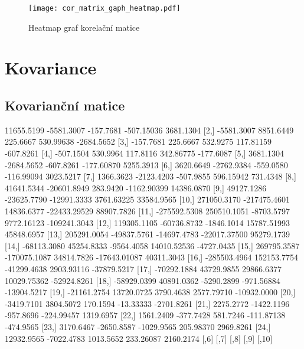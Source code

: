 \documentclass[a4paper, 12pt]{article}
\begin{document}
\begin{figure}[H]
\centering

\texttt{[image: cor\_matrix\_gaph\_heatmap.pdf]}
\caption{Heatmap graf korelační matice}
\end{figure}

\section{Kovariance}
\subsection{Kovarianční matice}
\begin{Schunk}
\begin{Soutput}
              [,1]         [,2]        [,3]         [,4]         [,5]
 [1,]   11655.5199   -5581.3007   -157.7681   -507.15036    3681.1304
 [2,]   -5581.3007    8851.6449    225.6667    530.99638   -2684.5652
 [3,]    -157.7681     225.6667    532.9275    117.81159    -607.8261
 [4,]    -507.1504     530.9964    117.8116    342.86775    -177.6087
 [5,]    3681.1304   -2684.5652   -607.8261   -177.60870    5255.3913
 [6,]    3620.6649   -2762.9384   -559.0580   -116.99094    3023.5217
 [7,]    1366.3623   -2123.4203   -507.9855    596.15942     731.4348
 [8,]   41641.5344  -20601.8949    283.9420  -1162.90399   14386.0870
 [9,]   49127.1286  -23625.7790 -12991.3333   3761.63225   33584.9565
[10,]  271050.3170 -217475.4601  14836.6377 -22433.29529   88907.7826
[11,] -275592.5308  250510.1051  -8703.5797   9772.16123 -109241.3043
[12,]  119305.1105  -60736.8732  -1846.1014  15787.51993   45848.6957
[13,]  205291.0054  -49837.5761 -14697.4783 -22017.37500   95279.1739
[14,]  -68113.3080   45254.8333  -9564.4058  14010.52536   -4727.0435
[15,]  269795.3587 -170075.1087  34814.7826 -17643.01087   40311.3043
[16,] -285503.4964  152153.7754 -41299.4638   2903.93116  -37879.5217
[17,]  -70292.1884   43729.9855  29866.6377  10029.75362  -52924.8261
[18,]  -58929.0399   40891.0362  -5290.2899   -971.56884  -13904.5217
[19,]  -21161.2754   13720.0725   3790.4638   2577.79710  -10932.0000
[20,]   -3419.7101    3804.5072    170.1594    -13.33333   -2701.8261
[21,]    2275.2772   -1422.1196   -957.8696   -224.99457    1319.6957
[22,]    1561.2409    -377.7428    581.7246   -111.87138    -474.9565
[23,]    3170.6467   -2650.8587  -1029.9565    205.98370    2969.8261
[24,]   12932.9565   -7022.4783   1013.5652    233.26087    2160.2174
               [,6]         [,7]         [,8]         [,9]         [,10]

\end{Soutput}
\end{Schunk}
\end{document}
